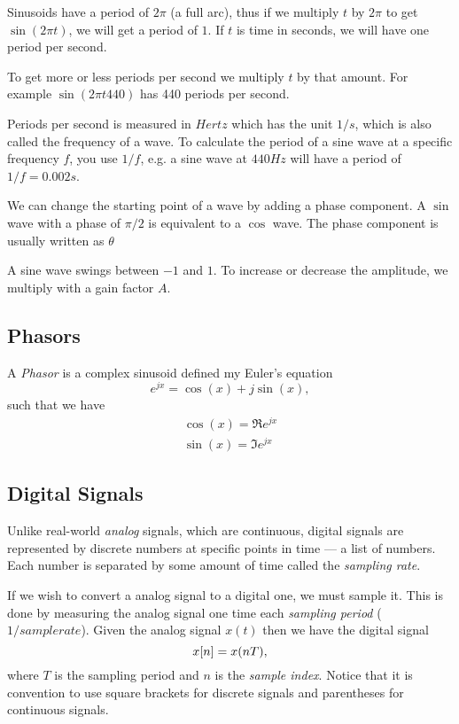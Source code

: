 \documentclass[11pt]{article}
\let\originalleft\left
\let\originalright\right
\renewcommand{\left}{\mathopen{}\mathclose\bgroup\originalleft}
\renewcommand{\right}{\aftergroup\egroup\originalright}
\def\lsqb{\left[}
\def\rsqb{\right]}
\def\sqb#1{\lsqb #1 \rsqb}
\def\xsig{x\sqb{n}}
\begin{document}
Sinusoids have a period of $2 \pi$ (a full arc), thus if we multiply $t$ by $2\pi$ to get $\sin(2 \pi t)$, we will get a period of $1$. If $t$ is time in seconds, we will have one period per second.

To get more or less periods per second we multiply $t$ by that amount. For example $\sin(2 \pi t 440)$ has 440 periods per second.

Periods per second is measured in $Hertz$ which has the unit $1/s$, which is also called the frequency of a wave. To calculate the period of a sine wave at a specific frequency $f$, you use $1/f$, e.g. a sine wave at $440Hz$ will have a period of $1/f=0.002s$.

We can change the starting point of a wave by adding a phase component. A $\sin$ wave with a phase of $\pi/2$ is equivalent to a $\cos$ wave. The phase component is usually written as $\theta$

A sine wave swings between $-1$ and $1$. To increase or decrease the amplitude, we multiply with a gain factor $A$.

\subsection{Phasors}
A \textit{Phasor} is a complex sinusoid defined my Euler's equation
\begin{equation}
    e^{jx} = \cos(x) + j\sin(x),
\end{equation}
such that we have
\begin{align}
    \cos(x) = \Re{e^{jx}}\\
    \sin(x) = \Im{e^{jx}}
\end{align}

\subsection{Digital Signals}
Unlike real-world \textit{analog} signals, which are continuous, digital signals are represented by discrete numbers at specific points in time --- a list of numbers. Each number is separated by some amount of time called the \textit{sampling rate}.

If we wish to convert a analog signal to a digital one, we must sample it. This is done by measuring the analog signal one time each \textit{sampling period} ($1/samplerate$). Given the analog signal $x(t)$ then we have the digital signal
\begin{equation}
    \xsig = x(nT),
\end{equation}
where $T$ is the sampling period and $n$ is the \textit{sample index}. Notice that it is convention to use square brackets for discrete signals and parentheses for continuous signals.
\end{document}

